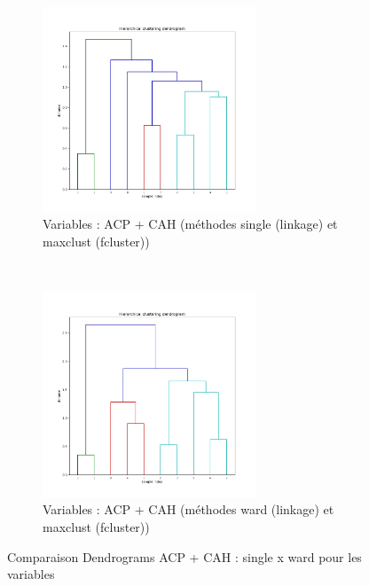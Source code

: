     \begin{figure}[!htb]
        \begin{subfigure}[b]{1.0\textwidth}
            \centering
            \includegraphics[width=0.7\textwidth]{img/mixte_acp_cah/Dendrogram_variables_'single'_'maxclust'.jpg}
            \caption{Variables : ACP + CAH (méthodes single (linkage) et maxclust (fcluster))}
            \label{Label_Dendrogram_variables_'single'_'maxclust'.jpg}
        \end{subfigure}
        \\
        \begin{subfigure}[b]{1.0\textwidth}
            \centering
            \includegraphics[width=0.7\textwidth]{img/mixte_acp_cah/Dendrogram_variables_'ward'_'maxclust'.jpg}
            \caption{Variables : ACP + CAH (méthodes ward (linkage) et maxclust (fcluster))}
            \label{Label_Dendrogram_variables_'ward'_'maxclust'.jpg}
        \end{subfigure}
        \caption{Comparaison Dendrograms ACP + CAH : single x ward pour les variables}
    \end{figure}
    

